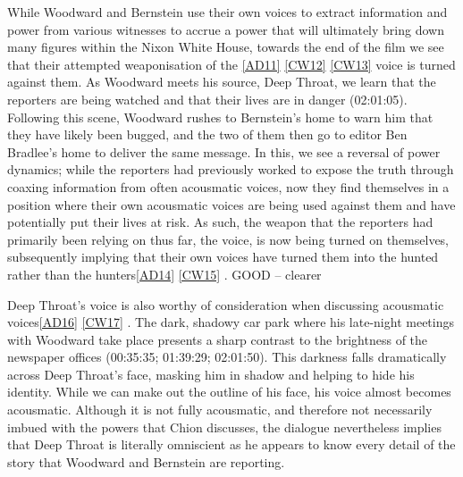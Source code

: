 While Woodward and Bernstein use their own voices to extract information and power from various witnesses to accrue a power that will ultimately bring down many figures within the Nixon White House, towards the end of the film we see that their attempted weaponisation of the \href{applewebdata://3A1D666A-D52A-46D2-8C90-343A1EE58F85\#_msocom_11}{[AD11]} \href{applewebdata://3A1D666A-D52A-46D2-8C90-343A1EE58F85\#_msocom_12}{[CW12]} \href{applewebdata://3A1D666A-D52A-46D2-8C90-343A1EE58F85\#_msocom_13}{[CW13]} voice is turned against them.
As Woodward meets his source, Deep Throat, we learn that the reporters are being watched and that their lives are in danger (02:01:05).
Following this scene, Woodward rushes to Bernstein’s home to warn him that they have likely been bugged, and the two of them then go to editor Ben Bradlee’s home to deliver the same message.
In this, we see a reversal of power dynamics; while the reporters had previously worked to expose the truth through coaxing information from often acousmatic voices, now they find themselves in a position where their own acousmatic voices are being used against them and have potentially put their lives at risk.
As such, the weapon that the reporters had primarily been relying on thus far, the voice, is now being turned on themselves, subsequently implying that their own voices have turned them into the hunted rather than the hunters\href{applewebdata://3A1D666A-D52A-46D2-8C90-343A1EE58F85\#_msocom_14}{[AD14]} \href{applewebdata://3A1D666A-D52A-46D2-8C90-343A1EE58F85\#_msocom_15}{[CW15]} . GOOD – clearer

Deep Throat’s voice is also worthy of consideration when discussing acousmatic voices\href{applewebdata://3A1D666A-D52A-46D2-8C90-343A1EE58F85\#_msocom_16}{[AD16]} \href{applewebdata://3A1D666A-D52A-46D2-8C90-343A1EE58F85\#_msocom_17}{[CW17]} .
The dark, shadowy car park where his late-night meetings with Woodward take place presents a sharp contrast to the brightness of the newspaper offices (00:35:35; 01:39:29; 02:01:50).
This darkness falls dramatically across Deep Throat’s face, masking him in shadow and helping to hide his identity. While we can make out the outline of his face, his voice almost becomes acousmatic.
Although it is not fully acousmatic, and therefore not necessarily imbued with the powers that Chion discusses, the dialogue nevertheless implies that Deep Throat is literally omniscient as he appears to know every detail of the story that Woodward and Bernstein are reporting.

